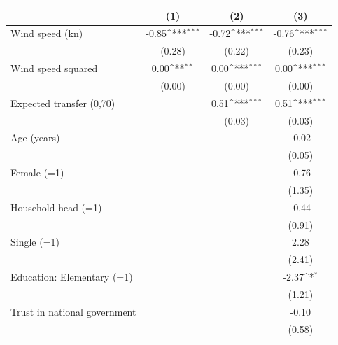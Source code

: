 {
\def\sym#1{\ifmmode^{#1}\else\(^{#1}\)\fi}
\begin{tabular}{l*{3}{c}}
\toprule
                    &\multicolumn{1}{c}{(1)}         &\multicolumn{1}{c}{(2)}         &\multicolumn{1}{c}{(3)}         \\
\midrule
Wind speed (kn)     &       -0.85\sym{***}&       -0.72\sym{***}&       -0.76\sym{***}\\
                    &      (0.28)         &      (0.22)         &      (0.23)         \\
Wind speed squared  &        0.00\sym{**} &        0.00\sym{***}&        0.00\sym{***}\\
                    &      (0.00)         &      (0.00)         &      (0.00)         \\
Expected transfer (0,70)&                     &        0.51\sym{***}&        0.51\sym{***}\\
                    &                     &      (0.03)         &      (0.03)         \\
Age (years)         &                     &                     &       -0.02         \\
                    &                     &                     &      (0.05)         \\
Female (=1)         &                     &                     &       -0.76         \\
                    &                     &                     &      (1.35)         \\
Household head (=1) &                     &                     &       -0.44         \\
                    &                     &                     &      (0.91)         \\
Single (=1)         &                     &                     &        2.28         \\
                    &                     &                     &      (2.41)         \\
Education: Elementary (=1)&                     &                     &       -2.37\sym{*}  \\
                    &                     &                     &      (1.21)         \\
Trust in national government&                     &                     &       -0.10         \\
                    &                     &                     &      (0.58)         \\

\end{tabular}}
